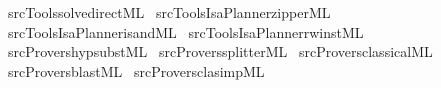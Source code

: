 \begin{isabellebody}
\isamarkupfalse%
\ {\isacartoucheopen}{\isachartilde}{\kern0pt}{\isachartilde}{\kern0pt}{\isacharslash}{\kern0pt}src{\isacharslash}{\kern0pt}Tools{\isacharslash}{\kern0pt}solve{\isacharunderscore}{\kern0pt}direct{\isachardot}{\kern0pt}ML{\isacartoucheclose}\isanewline
{}\isamarkupfalse%
\ {\isacartoucheopen}{\isachartilde}{\kern0pt}{\isachartilde}{\kern0pt}{\isacharslash}{\kern0pt}src{\isacharslash}{\kern0pt}Tools{\isacharslash}{\kern0pt}IsaPlanner{\isacharslash}{\kern0pt}zipper{\isachardot}{\kern0pt}ML{\isacartoucheclose}\isanewline
{}\isamarkupfalse%
\ {\isacartoucheopen}{\isachartilde}{\kern0pt}{\isachartilde}{\kern0pt}{\isacharslash}{\kern0pt}src{\isacharslash}{\kern0pt}Tools{\isacharslash}{\kern0pt}IsaPlanner{\isacharslash}{\kern0pt}isand{\isachardot}{\kern0pt}ML{\isacartoucheclose}\isanewline
{}\isamarkupfalse%
\ {\isacartoucheopen}{\isachartilde}{\kern0pt}{\isachartilde}{\kern0pt}{\isacharslash}{\kern0pt}src{\isacharslash}{\kern0pt}Tools{\isacharslash}{\kern0pt}IsaPlanner{\isacharslash}{\kern0pt}rw{\isacharunderscore}{\kern0pt}inst{\isachardot}{\kern0pt}ML{\isacartoucheclose}\isanewline
{}\isamarkupfalse%
\ {\isacartoucheopen}{\isachartilde}{\kern0pt}{\isachartilde}{\kern0pt}{\isacharslash}{\kern0pt}src{\isacharslash}{\kern0pt}Provers{\isacharslash}{\kern0pt}hypsubst{\isachardot}{\kern0pt}ML{\isacartoucheclose}\isanewline
{}\isamarkupfalse%
\ {\isacartoucheopen}{\isachartilde}{\kern0pt}{\isachartilde}{\kern0pt}{\isacharslash}{\kern0pt}src{\isacharslash}{\kern0pt}Provers{\isacharslash}{\kern0pt}splitter{\isachardot}{\kern0pt}ML{\isacartoucheclose}\isanewline
{}\isamarkupfalse%
\ {\isacartoucheopen}{\isachartilde}{\kern0pt}{\isachartilde}{\kern0pt}{\isacharslash}{\kern0pt}src{\isacharslash}{\kern0pt}Provers{\isacharslash}{\kern0pt}classical{\isachardot}{\kern0pt}ML{\isacartoucheclose}\isanewline
{}\isamarkupfalse%
\ {\isacartoucheopen}{\isachartilde}{\kern0pt}{\isachartilde}{\kern0pt}{\isacharslash}{\kern0pt}src{\isacharslash}{\kern0pt}Provers{\isacharslash}{\kern0pt}blast{\isachardot}{\kern0pt}ML{\isacartoucheclose}\isanewline
{}\isamarkupfalse%
\ {\isacartoucheopen}{\isachartilde}{\kern0pt}{\isachartilde}{\kern0pt}{\isacharslash}{\kern0pt}src{\isacharslash}{\kern0pt}Provers{\isacharslash}{\kern0pt}clasimp{\isachardot}{\kern0pt}ML{\isacartoucheclose}\isanewline

\end{isabellebody}
